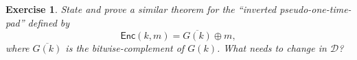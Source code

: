 \documentclass[11pt]{article}
\newtheorem{exercise}{Exercise}
\newcommand{\Enc}{\mathsf{Enc}}
\newcommand{\calD}{\mathcal{D}}
\newcommand{\calA}{\mathcal{A}}
\begin{document}
\begin{exercise}
    State and prove a similar theorem for the ``inverted pseudo-one-time-pad''
    defined by
    \[
        \Enc(k,m) = \overline{G(k)}\oplus m,
    \]
    where $\overline{G(k)}$ is the bitwise-complement of $G(k)$. What
    needs to change in $\calD$?
\end{exercise}


%
%
%
%
\end{document}
